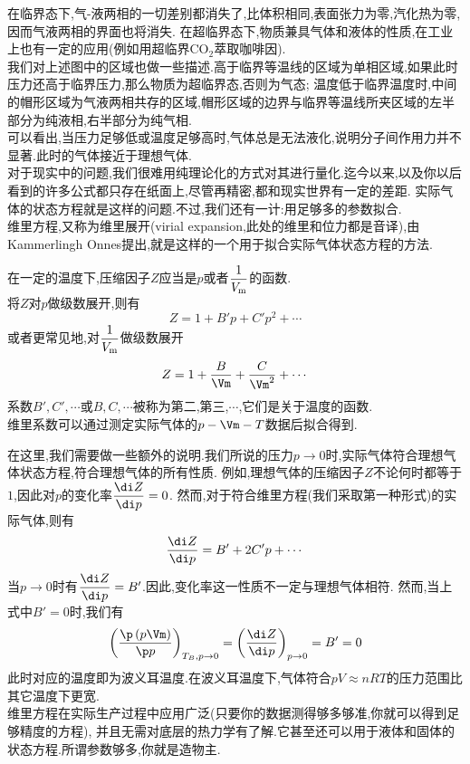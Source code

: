 \documentclass{ctexart}
\begin{document}
在临界态下,气-液两相的一切差别都消失了,比体积相同,表面张力为零,汽化热为零,因而气液两相的界面也将消失.%
在超临界态下,物质兼具气体和液体的性质,在工业上也有一定的应用(例如用超临界$\text{CO}_2$萃取咖啡因).\\
\indent 我们对上述图中的区域也做一些描述.高于临界等温线的区域为单相区域,如果此时压力还高于临界压力,那么物质为超临界态,否则为气态;%
温度低于临界温度时,中间的帽形区域为气液两相共存的区域,帽形区域的边界与临界等温线所夹区域的左半部分为纯液相,右半部分为纯气相.\\
\indent 可以看出,当压力足够低或温度足够高时,气体总是无法液化,说明分子间作用力并不显著.此时的气体接近于理想气体.%
\vspace{12pt}\\
\indent 对于现实中的问题,我们很难用纯理论化的方式对其进行量化.迄今以来,以及你以后看到的许多公式都只存在纸面上,尽管再精密,都和现实世界有一定的差距.%
实际气体的状态方程就是这样的问题.不过,我们还有一计:用足够多的参数拟合.\\
\indent 维里方程,又称为维里展开(virial expansion,此处的维里和位力都是音译),由Kammerlingh Onnes提出,就是这样的一个用于拟合实际气体状态方程的方法.
\begin{theorem}[1C.2 维里方程]
    在一定的温度下,压缩因子$Z$应当是$p$或者$\dfrac{1}{V_\text m}$的函数.\\
    将$Z$对$p$做级数展开,则有
    \[Z=1+B'p+C'p^2+\cdots\]
    或者更常见地,对$\dfrac{1}{V_\text m}$做级数展开
    \[Z=1+\dfrac{B}{\Vm}+\dfrac{C}{\Vm^2}+\cdots\]
    系数$B',C',\cdots$或$B,C,\cdots$被称为第二,第三,$\cdots$,它们是关于温度的函数.\\
    维里系数可以通过测定实际气体的$p-\Vm-T$数据后拟合得到.
\end{theorem}
在这里,我们需要做一些额外的说明.我们所说的压力$p\to0$时,实际气体符合理想气体状态方程,符合理想气体的所有性质.%
例如,理想气体的压缩因子$Z$不论何时都等于$1$,因此对$p$的变化率$\dfrac{\di Z}{\di p}=0$.%
然而,对于符合维里方程(我们采取第一种形式)的实际气体,则有
\[\dfrac{\di Z}{\di p}=B'+2C'p+\cdots\]
当$p\to0$时有$\dfrac{\di Z}{\di p}=B'$.因此,变化率这一性质不一定与理想气体相符.%
然而,当上式中$B'=0$时,我们有
\[\left(\dfrac{\p\left(p\Vm\right)}{\p p}\right)_{T_B,p\to0}=\left(\dfrac{\di Z}{\di p}\right)_{p\to0}=B'=0\]
此时对应的温度即为波义耳温度.在波义耳温度下,气体符合$pV\approx nRT$的压力范围比其它温度下更宽.\\
\indent 维里方程在实际生产过程中应用广泛(只要你的数据测得够多够准,你就可以得到足够精度的方程),%
并且无需对底层的热力学有了解.它甚至还可以用于液体和固体的状态方程.所谓参数够多,你就是造物主.%
\end{document}

